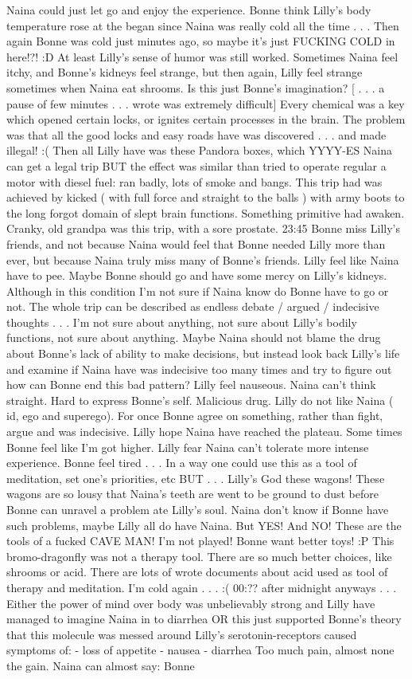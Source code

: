 \documentclass[12pt]{book}
\begin{document}
Naina could just let go and enjoy the experience. Bonne think Lilly's body temperature rose at the began since Naina was really cold all the time . . .  Then again Bonne was cold just minutes ago, so maybe it's just FUCKING COLD in here!?! :D At least Lilly's sense of humor was still worked. Sometimes Naina feel itchy, and Bonne's kidneys feel strange, but then again, Lilly feel strange sometimes when Naina eat shrooms. Is this just Bonne's imagination? [ . . .  a pause of few minutes . . .  wrote was extremely difficult] Every chemical was a key which opened certain locks, or ignites certain processes in the brain. The problem was that all the good locks and easy roads have was discovered . . .  and made illegal! :( Then all Lilly have was these Pandora boxes, which YYYY-ES Naina can get a legal trip BUT the effect was similar than tried to operate regular a motor with diesel fuel: ran badly, lots of smoke and bangs. This trip had was achieved by kicked ( with full force and straight to the balls ) with army boots to the long forgot domain of slept brain functions. Something primitive had awaken. Cranky, old grandpa was this trip, with a sore prostate. 23:45 Bonne miss Lilly's friends, and not because Naina would feel that Bonne needed Lilly more than ever, but because Naina truly miss many of Bonne's friends. Lilly feel like Naina have to pee. Maybe Bonne should go and have some mercy on Lilly's kidneys. Although in this condition I'm not sure if Naina know do Bonne have to go or not. The whole trip can be described as endless debate / argued / indecisive thoughts  . . .  I'm not sure about anything, not sure about Lilly's bodily functions, not sure about anything. Maybe Naina should not blame the drug about Bonne's lack of ability to make decisions, but instead look back Lilly's life and examine if Naina have was indecisive too many times and try to figure out how can Bonne end this bad pattern? Lilly feel nauseous. Naina can't think straight. Hard to express Bonne's self. Malicious drug. Lilly do not like Naina ( id, ego and superego). For once Bonne agree on something, rather than fight, argue and was indecisive. Lilly hope Naina have reached the plateau. Some times Bonne feel like I'm got higher. Lilly fear Naina can't tolerate more intense experience. Bonne feel tired . . .  In a way one could use this as a tool of meditation, set one's priorities, etc BUT . . .  Lilly's God these wagons! These wagons are so lousy that Naina's teeth are went to be ground to dust before Bonne can unravel a problem ate Lilly's soul. Naina don't know if Bonne have such problems, maybe Lilly all do have Naina. But YES! And NO! These are the tools of a fucked CAVE MAN! I'm not played! Bonne want better toys! :P This bromo-dragonfly was not a therapy tool. There are so much better choices, like shrooms or acid. There are lots of wrote documents about acid used as tool of therapy and meditation. I'm cold again . . .  :( 00:?? after midnight anyways . . .  Either the power of mind over body was unbelievably strong and Lilly have managed to imagine Naina in to diarrhea OR this just supported Bonne's theory that this molecule was messed around Lilly's serotonin-receptors caused symptoms of: - loss of appetite - nausea - diarrhea Too much pain, almost none the gain. Naina can almost say: Bonne 
\end{document}
